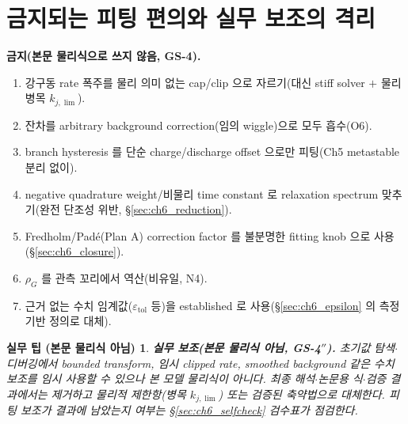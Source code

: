 \documentclass[11pt,a4paper]{article}
\newtheorem*{practicebox}{실무 팁 (본문 물리식 아님)}
\newcommand{\tol}{\mathrm{tol}}
\begin{document}
\section{금지되는 피팅 편의와 실무 보조의 격리}\label{sec:ch6_forbidden}
\textbf{금지(본문 물리식으로 쓰지 않음, GS-4).}
\begin{enumerate}[label=(\arabic*),leftmargin=2.4em]
\item 강구동 rate 폭주를 물리 의미 없는 cap/clip 으로 자르기(대신 stiff solver $+$ 물리 병목 $k_{j,\lim}$).
\item 잔차를 arbitrary background correction(임의 wiggle)으로 모두 흡수(O6).
\item branch hysteresis 를 단순 charge/discharge offset 으로만 피팅(Ch5 metastable 분리 없이).
\item negative quadrature weight/비물리 time constant 로 relaxation spectrum 맞추기(완전 단조성 위반, \S\ref{sec:ch6_reduction}).
\item Fredholm/Padé(Plan A) correction factor 를 불분명한 fitting knob 으로 사용(\S\ref{sec:ch6_closure}).
\item $\rho_G$ 를 관측 꼬리에서 역산(비유일, N4).
\item 근거 없는 수치 임계값($\varepsilon_\tol$ 등)을 established 로 사용(\S\ref{sec:ch6_epsilon} 의 측정 기반 정의로 대체).
\end{enumerate}
\begin{practicebox}
\textbf{실무 보조(본문 물리식 아님, GS-4$''$).} 초기값 탐색$\cdot$디버깅에서 bounded transform, 임시 clipped rate,
smoothed background 같은 수치 보조를 \emph{임시} 사용할 수 있으나 본 모델 물리식이 아니다. 최종 해석$\cdot$논문용
식$\cdot$검증 결과에서는 제거하고 물리적 제한항(병목 $k_{j,\lim}$) 또는 검증된 축약법으로 대체한다. 피팅 보조가
결과에 남았는지 여부는 \S\ref{sec:ch6_selfcheck} 검수표가 점검한다.
\end{practicebox}

\end{document}
